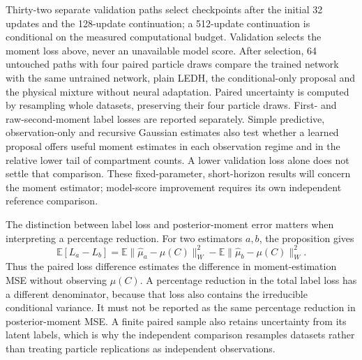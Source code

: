Thirty-two separate validation paths select checkpoints after the initial
32 updates and the 128-update continuation; a 512-update continuation is
conditional on the measured computational budget. Validation selects the
moment loss above, never an unavailable model score. After selection, 64
untouched paths with four paired particle draws compare the trained network
with the same untrained network, plain LEDH, the conditional-only proposal
and the physical mixture without neural adaptation. Paired uncertainty is
computed by resampling whole datasets, preserving their four particle draws.
First- and raw-second-moment label losses are reported separately. Simple predictive,
observation-only and recursive Gaussian estimates also test whether a learned
proposal offers useful moment estimates in each observation regime and in
the relative lower tail of compartment counts. A lower validation loss alone
does not settle that comparison. These fixed-parameter, short-horizon results
will concern the moment estimator; model-score improvement requires its own
independent reference comparison.

The distinction between label loss and posterior-moment error matters when
interpreting a percentage reduction. For two estimators \(a,b\), the
proposition gives
\[
 \mathbb E[L_a-L_b]
 =\mathbb E\|\widehat\mu_a-\mu(C)\|_W^2
  -\mathbb E\|\widehat\mu_b-\mu(C)\|_W^2.
\]
Thus the paired loss difference estimates the difference in moment-estimation
MSE without observing \(\mu(C)\). A percentage reduction in the total label
loss has a different denominator, because that loss also contains the
irreducible conditional variance. It must not be reported as the same
percentage reduction in posterior-moment MSE. A finite paired sample also
retains uncertainty from its latent labels, which is why the independent
comparison resamples datasets rather than treating particle replications as
independent observations.

